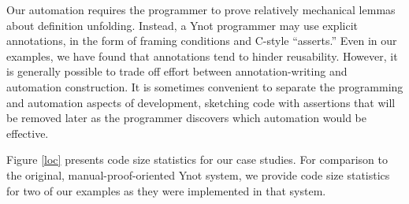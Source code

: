 \documentclass[preprint,nocopyrightspace]{sigplanconf}
\begin{document}
Our automation requires the programmer to prove relatively mechanical
lemmas about definition unfolding.  Instead, a Ynot programmer may use
explicit annotations, in the form of framing conditions and C-style
``asserts.''  Even in our examples, we have found that annotations
tend to hinder reusability.  However, it is generally possible to
trade off effort between annotation-writing and automation
construction.  It is sometimes convenient to separate the programming
and automation aspects of development, sketching code with assertions
that will be removed later as the programmer discovers which
automation would be effective.

Figure \ref{loc} presents code size statistics for our case studies.
For comparison to the original, manual-proof-oriented Ynot system, we
provide code size statistics for two of our examples as they were
implemented in that system.
\end{document}
